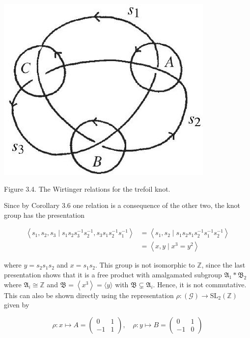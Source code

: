 \documentclass[10pt, letterpaper]{article}
\begin{document}
\begin{center}
\includegraphics[scale=0.2]{2025_05_21_9c06be8de7a55410f8c1g-049(1)}
\end{center}

Figure 3.4. The Wirtinger relations for the trefoil knot.

Since by Corollary 3.6 one relation is a consequence of the other two, the knot group has the presentation

$$
\begin{aligned}
\left\langle s_{1}, s_{2}, s_{3} \mid s_{1} s_{2} s_{3}^{-1} s_{2}^{-1}, s_{3} s_{1} s_{2}^{-1} s_{1}^{-1}\right\rangle & =\left\langle s_{1}, s_{2} \mid s_{1} s_{2} s_{1} s_{2}^{-1} s_{1}^{-1} s_{2}^{-1}\right\rangle \\
& =\left\langle x, y \mid x^{3}=y^{2}\right\rangle
\end{aligned}
$$

where $y=s_{2} s_{1} s_{2}$ and $x=s_{1} s_{2}$. This group is not isomorphic to $\mathbb{Z}$, since the last presentation shows that it is a free product with amalgamated subgroup $\mathfrak{A}_{1} * \mathfrak{B}_{2}$ where $\mathfrak{A}_{i} \cong \mathbb{Z}$ and $\mathfrak{B}=\left\langle x^{3}\right\rangle=\langle y\rangle$ with $\mathfrak{B} \subsetneq \mathfrak{A}_{i}$. Hence, it is not commutative. This can also be shown directly using the representation $\rho:(\mathcal{G}) \rightarrow \mathrm{SL}_{2}(\mathbb{Z})$ given by

$$
\rho: x \mapsto A=\left(\begin{array}{cc}
0 & 1 \\
-1 & 1
\end{array}\right), \quad \rho: y \mapsto B=\left(\begin{array}{rr}
0 & 1 \\
-1 & 0
\end{array}\right)
$$
\end{document}
